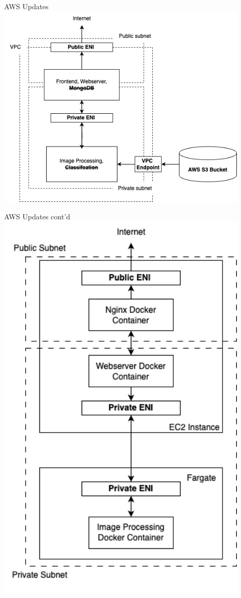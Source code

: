 \begin{frame}{AWS Updates}
    \centering
    \includegraphics[height=0.9\textheight,width=0.9\textwidth,keepaspectratio]{images/mm_8-13-system.png}
\end{frame}

\begin{frame}{AWS Updates cont'd}
    \centering
    \includegraphics[height=0.9\textheight,width=0.9\textwidth,keepaspectratio]{images/mm_8-13-system-networking.png}
\end{frame}

